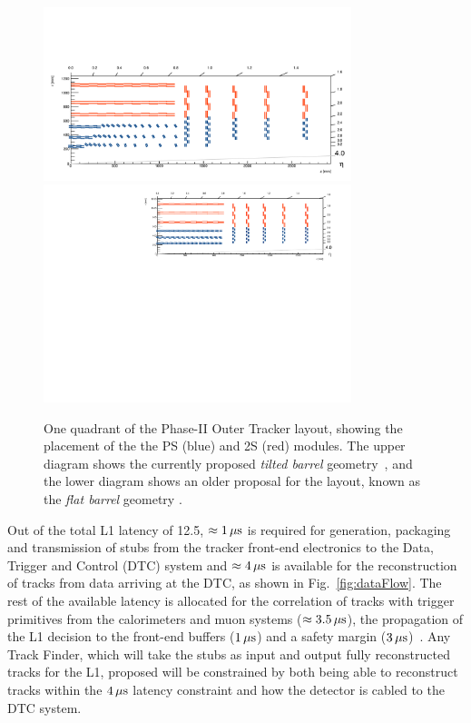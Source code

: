 \begin{figure}[tbp]
\centering
\includegraphics[width=0.8\textwidth,trim={1.1truecm 0truecm 1truecm 12truecm},clip]{figs/tk-upgrade/tiltedbarrelmap.pdf}
\includegraphics[width=0.8\textwidth,trim={0.7truecm 0truecm 1truecm 0truecm},clip]{figs/tk-upgrade/mersilayout.pdf}
\caption{One quadrant of the Phase-II Outer Tracker layout, showing the placement of the the PS (blue) and 2S (red) modules. The upper diagram shows the currently proposed \emph{tilted barrel} geometry~\cite{tiltedGeometry, P2TrackerTDR}, and the lower diagram shows an older proposal for the layout, known as the \emph{flat barrel} geometry \cite{CMS_Upgrade_TP}.}
\label{fig:trackerlayout}
\end{figure}

Out of the total L1 latency of 12.5\mus, $\approx 1\,\mu\text{s}$ is required for generation, packaging and transmission of stubs from the tracker front-end electronics to the Data, Trigger and Control (DTC) system and $\approx 4\,\mu\text{s}$ is available for the reconstruction of tracks from data arriving at the DTC, as shown in Fig.~\ref{fig:dataFlow}.
The rest of the available latency is allocated for the correlation of tracks with trigger primitives from the calorimeters and muon systems ($\approx 3.5\,\mu\text{s}$), the propagation of the L1 decision to the front-end buffers ($1\,\mu\text{s}$) and a safety margin ($3\,\mu\text{s}$)~\cite{CMS_Upgrade_TP}.
Any Track Finder, which will take the stubs as input and output fully reconstructed tracks for the L1, proposed will be constrained by both being able to reconstruct tracks within the $4\,\mu\text{s}$ latency constraint and how the detector is cabled to the DTC system.

